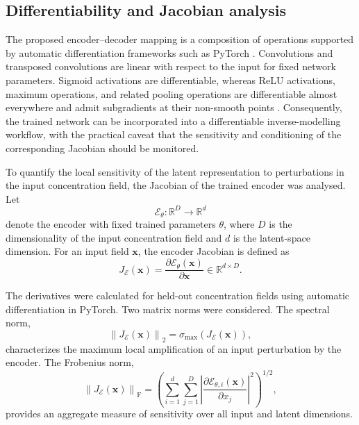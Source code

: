 \documentclass[pdflatex,sn-mathphys-num]{sn-jnl}%
\theoremstyle{thmstyleone}%
\theoremstyle{thmstyletwo}%
\theoremstyle{thmstylethree}%
\begin{document}
\subsection{Differentiability and Jacobian analysis}

The proposed encoder--decoder mapping is a composition of operations supported by automatic differentiation frameworks such as PyTorch \citep{Paszke2019}. Convolutions and transposed convolutions are linear with respect to the input for fixed network parameters. Sigmoid activations are differentiable, whereas ReLU activations, maximum operations, and related pooling operations are differentiable almost everywhere and admit subgradients at their non-smooth points \citep{Rumelhart1986,LeCun2015,Bottou2016}. Consequently, the trained network can be incorporated into a differentiable inverse-modelling workflow, with the practical caveat that the sensitivity and conditioning of the corresponding Jacobian should be monitored.

To quantify the local sensitivity of the latent representation to perturbations in the input concentration field, the Jacobian of the trained encoder was analysed. Let
\begin{equation}
\mathcal{E}_{\theta}\colon \mathbb{R}^{D} \rightarrow \mathbb{R}^{d}
\end{equation}
denote the encoder with fixed trained parameters $\theta$, where $D$ is the dimensionality of the input concentration field and $d$ is the latent-space dimension. For an input field $\mathbf{x}$, the encoder Jacobian is defined as
\begin{equation}
J_{\mathcal{E}}(\mathbf{x})
=
\frac{\partial \mathcal{E}_{\theta}(\mathbf{x})}
{\partial \mathbf{x}}
\in \mathbb{R}^{d \times D}.
\label{eq:encoder_jacobian}
\end{equation}

The derivatives were calculated for held-out concentration fields using automatic differentiation in PyTorch. Two matrix norms were considered. The spectral norm,
\begin{equation}
\left\lVert J_{\mathcal{E}}(\mathbf{x}) \right\rVert_{2}
=
\sigma_{\max}\!\left(J_{\mathcal{E}}(\mathbf{x})\right),
\label{eq:jacobian_spectral_norm}
\end{equation}
characterizes the maximum local amplification of an input perturbation by the encoder. The Frobenius norm,
\begin{equation}
\left\lVert J_{\mathcal{E}}(\mathbf{x}) \right\rVert_{\mathrm{F}}
=
\left(\sum_{i=1}^{d}
\sum_{j=1}^{D}
\left|
\frac{\partial \mathcal{E}_{\theta,i}(\mathbf{x})}
{\partial x_j}
\right|^{2}
\right)^{1/2},
\label{eq:jacobian_frobenius_norm}
\end{equation}
provides an aggregate measure of sensitivity over all input and latent dimensions.
\end{document}
